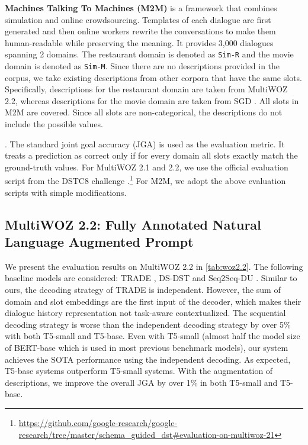\documentclass[11pt]{article}
\begin{document}
\noindent
\textbf{Machines Talking To Machines
(M2M)} \cite{shah2018building}
is a framework that combines simulation and online crowdsourcing. Templates of each dialogue are first generated and then online workers rewrite the conversations to make them human-readable while preserving the meaning. It provides 3,000 dialogues spanning 2 domains. 
The restaurant domain is denoted as \texttt{Sim-R} and the movie domain is denoted as \texttt{Sim-M}. 
Since there are no descriptions provided in the corpus, we take existing descriptions from other corpora that have the same slots.
Specifically, descriptions for the restaurant domain are taken from MultiWOZ 2.2,
whereas descriptions for the movie domain are taken from SGD \cite{rastogi2020towards}.
All slots in M2M are covered. Since all slots are non-categorical, the descriptions do not include the possible values.






















.
The standard joint goal accuracy (JGA) is used as the evaluation metric.
It treats a prediction as correct only if for every domain all slots exactly match the ground-truth values.
For MultiWOZ 2.1 and 2.2, we use the official evaluation script from the DSTC8 challenge \cite{rastogi2020schema}.\footnote{\url{https://github.com/google-research/google-research/tree/master/schema_guided_dst\#evaluation-on-multiwoz-21}}
For M2M, we adopt the above evaluation scripts with simple modifications.

\subsection{MultiWOZ 2.2: Fully Annotated Natural Language Augmented Prompt}
We present the evaluation results on MultiWOZ 2.2 in \autoref{tab:woz2.2}.
The following baseline models are considered: TRADE \cite{wu2019transferable}, DS-DST \cite{zhang2019find} and Seq2Seq-DU \cite{feng2020sequence}.
Similar to ours, the decoding strategy of TRADE is independent. 
However, the sum of domain and slot embeddings are the first input of the decoder, which makes their dialogue history representation not task-aware contextualized. 
The sequential decoding strategy is worse than the independent decoding strategy by over 5\% with both T5-small and T5-base. 
Even with T5-small (almost half the model size of BERT-base which is used in most previous benchmark models), our system achieves the SOTA performance using the independent decoding.
As expected, T5-base systems outperform T5-small systems. 
With the augmentation of descriptions, we improve the overall JGA by over 1\% in both T5-small and T5-base.  
\end{document}

